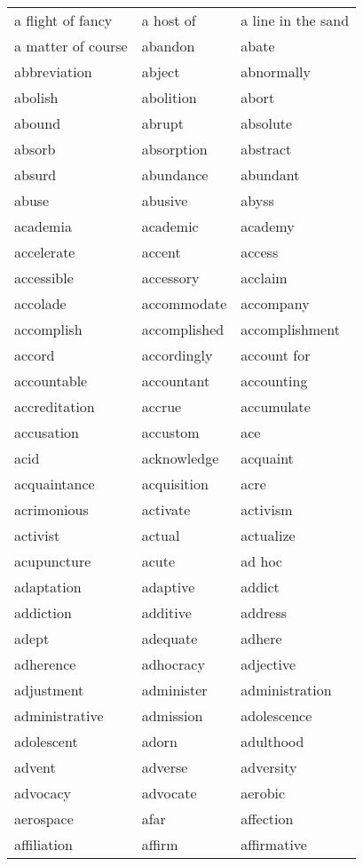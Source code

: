 \documentclass{minimal}
\begin{document}
\begin{longtable}{p{2.7cm}@{\hskip 0.2cm}p{2.7cm}@{\hskip 0.2cm}p{2.7cm}}
a flight of fancy & a host of & a line in the sand \\
a matter of course & abandon & abate \\
abbreviation & abject & abnormally \\
abolish & abolition & abort \\
abound & abrupt & absolute \\
absorb & absorption & abstract \\
absurd & abundance & abundant \\
abuse & abusive & abyss \\
academia & academic & academy \\
accelerate & accent & access \\
accessible & accessory & acclaim \\
accolade & accommodate & accompany \\
accomplish & accomplished & accomplishment \\
accord & accordingly & account for \\
accountable & accountant & accounting \\
accreditation & accrue & accumulate \\
accusation & accustom & ace \\
acid & acknowledge & acquaint \\
acquaintance & acquisition & acre \\
acrimonious & activate & activism \\
activist & actual & actualize \\
acupuncture & acute & ad hoc \\
adaptation & adaptive & addict \\
addiction & additive & address \\
adept & adequate & adhere \\
adherence & adhocracy & adjective \\
adjustment & administer & administration \\
administrative & admission & adolescence \\
adolescent & adorn & adulthood \\
advent & adverse & adversity \\
advocacy & advocate & aerobic \\
aerospace & afar & affection \\
affiliation & affirm & affirmative \\

\end{longtable}
\end{document}
